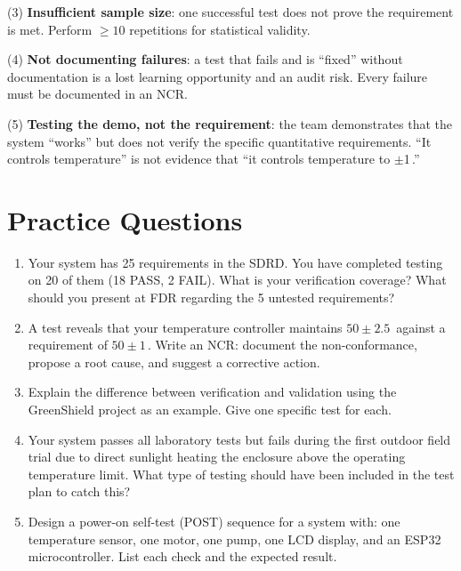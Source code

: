 (3) \textbf{Insufficient sample size}: one successful test does not prove the requirement is met. Perform $\geq 10$ repetitions for statistical validity.

(4) \textbf{Not documenting failures}: a test that fails and is ``fixed'' without documentation is a lost learning opportunity and an audit risk. Every failure must be documented in an NCR.

(5) \textbf{Testing the demo, not the requirement}: the team demonstrates that the system ``works'' but does not verify the specific quantitative requirements. ``It controls temperature'' is not evidence that ``it controls temperature to $\pm$1\,\degC{}.''
\section{Practice Questions}
\begin{enumerate}[leftmargin=1.5em]
\item Your system has 25 requirements in the SDRD. You have completed testing on 20 of them (18 PASS, 2 FAIL). What is your verification coverage? What should you present at FDR regarding the 5 untested requirements?
\item A test reveals that your temperature controller maintains $50 \pm 2.5$\,\degC{} against a requirement of $50 \pm 1$\,\degC{}. Write an NCR: document the non-conformance, propose a root cause, and suggest a corrective action.
\item Explain the difference between verification and validation using the GreenShield project as an example. Give one specific test for each.
\item Your system passes all laboratory tests but fails during the first outdoor field trial due to direct sunlight heating the enclosure above the operating temperature limit. What type of testing should have been included in the test plan to catch this?
\item Design a power-on self-test (POST) sequence for a system with: one temperature sensor, one motor, one pump, one LCD display, and an ESP32 microcontroller. List each check and the expected result.
\end{enumerate}


